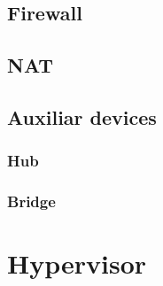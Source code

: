 \subsection{Firewall}
\label{sub-sec:firewall}

\subsection{NAT}
\label{sub-sec:nat}

\subsection{Auxiliar devices}
\label{sub-sec:auxdev}

\subsubsection{Hub}

\subsubsection{Bridge}

\section{Hypervisor}
\label{sub-sec:hypervisor}
